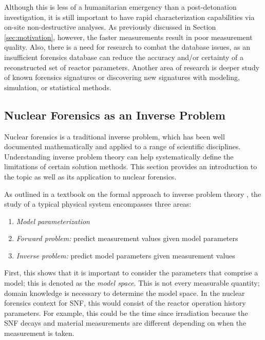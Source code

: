 Although this is less of a humanitarian emergency than a post-detonation
investigation, it is still important to have rapid characterization
capabilities via on-site non-destructive analyses.  As previously discussed in
Section \ref{sec:motivation}, however, the faster measurements result in poor
measurement quality. Also, there is a need for research to combat the database
issues, as an insufficient forensics database can reduce the accuracy and/or
certainty of a reconstructed set of reactor parameters.  Another area of
research is deeper study of known forensics signatures or discovering new
signatures with modeling, simulation, or statistical methods. 

\subsection{Nuclear Forensics as an Inverse Problem}
\label{sec:inverse}

Nuclear forensics is a traditional inverse problem, which has been well
documented mathematically and applied to a range of scientific disciplines.
Understanding inverse problem theory can help systematically define the
limitations of certain solution methods.  This section provides an introduction
to the topic as well as its application to nuclear forensics. 

As outlined in a textbook on the formal approach to inverse problem theory
\cite{inverse_theory}, the study of a typical physical system encompasses three
areas:
\begin{enumerate}
  \itemsep-0.75em
  \item \textit{Model parameterization}
  \item \textit{Forward problem:} predict measurement values given model parameters
  \item \textit{Inverse problem:} predict model parameters given measurement values
\end{enumerate}

First, this shows that it is important to consider the parameters that comprise
a model; this is denoted as the \textit{model space}. This is not every
measurable quantity; domain knowledge is necessary to determine the model
space. In the nuclear forensics context for \gls{SNF}, this would consist of
the reactor operation history parameters. For example, this could be the time
since irradiation because the \gls{SNF} decays and material measurements are
different depending on when the measurement is taken.

